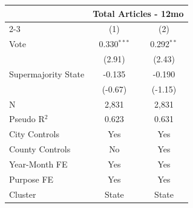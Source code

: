 \begingroup
\centering
\begin{tabular*}{\textwidth}{@{\extracolsep{\fill}}lcc}
   \toprule
    & \multicolumn{2}{c}{Total Articles - 12mo}\\
   \cmidrule(lr){2-3}
                       & (1)           & (2)\\  
   \midrule 
   Vote                & 0.330$^{***}$ & 0.292$^{**}$\\   
                       & (2.91)       & (2.43)\\   
   Supermajority State & -0.135        & -0.190\\   
                       & (-0.67)      & (-1.15)\\   
   \hline
   N        & 2,831         & 2,831\\  
   Pseudo R$^2$        & 0.623         & 0.631\\  
   City Controls              & Yes           & Yes\\
   County Controls            & No            & Yes\\
   Year-Month FE       & Yes           & Yes\\  
   Purpose FE          & Yes           & Yes\\  
   Cluster              & State & State\\  
   \bottomrule
\end{tabular*}
\par\endgroup
